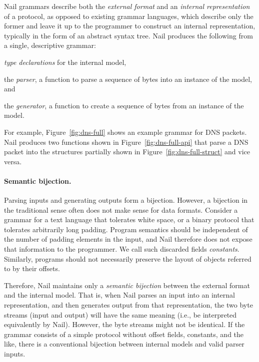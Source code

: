 Nail grammars describe both the \emph{external format} and an
\emph{internal representation} of a protocol, as opposed to existing
grammar languages, which describe only the former and leave it up to
the programmer to construct an internal representation, typically in
the form of an abstract syntax tree.
Nail produces the following from a single, descriptive grammar: 

\begin{CompactItemize}
\item \textit{type declarations} for the internal model,
\item the \textit{parser}, a function to parse a sequence of bytes into an
instance of the model, and
\item the \textit{generator}, a function to create a
sequence of bytes from an instance of the model.
\end{CompactItemize}

For example, Figure~\ref{fig:dns-full} shows an example grammar for DNS packets. Nail produces two
functions shown in Figure~\ref{fig:dns-full-api} that parse a DNS packet into the structures
partially shown in
Figure~\ref{fig:dns-full-struct} and vice versa.




\noindent

\paragraph{Semantic bijection.}
Parsing inputs and generating outputs form a bijection. However,
a bijection in the traditional sense often does not make sense for data
formats. Consider a grammar for a text language that tolerates white space, or a binary protocol
that tolerates arbitrarily long padding. Program semantics should be independent of the number of padding elements in the input, and Nail therefore
does not expose that information to the programmer. We call such discarded fields \emph{constants}. 
Similarly, programs should not necessarily preserve the layout of objects referred to by their offsets. 

Therefore, Nail  maintains only a  \emph{semantic bijection} between the external format and the internal model.
That is, when Nail parses an input into an internal representation, and then
generates output from that representation, the two byte streams (input and
output) will have the same meaning (i.e., be interpreted equivalently by Nail).
However, the byte streams might not be identical. If the grammar
consists of a simple protocol without offset fields, constants, and the like, there is a
conventional bijection between  internal models and valid parser inputs.
 

